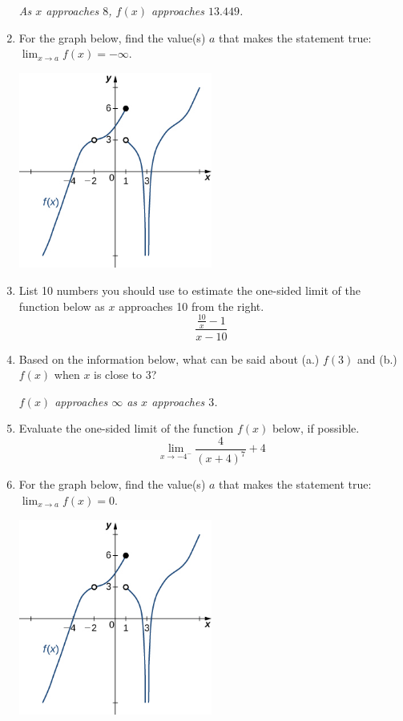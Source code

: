 \documentclass[14pt]{extbook}
\begin{document}
\begin{enumerate}
{\begin{center}
    \textit{ As $x$ approaches $8$, $f(x)$ approaches $13.449$. }
\end{center}
} \newpage
\item{
For the graph below, find the value(s) $a$ that makes the statement true: $ \displaystyle \lim_{x \rightarrow a} f(x) = -\infty$.
\begin{center}
    \includegraphics[width=0.5\textwidth]{../Figures/evaluateLimitGraphicallyC.png}
\end{center}
} \newpage
\item{
List 10 numbers you should use to estimate the one-sided limit of the function below as $x$ approaches 10 from the right.\[ \frac{\frac{10}{x} - 1}{x - 10} \]} \newpage
\item{
Based on the information below, what can be said about (a.) $f(3)$ and (b.) $f(x)$ when $x$ is close to $3$?
\begin{center}
    \textit{ $f(x)$ approaches $\infty$ as $x$ approaches $3$. }
\end{center}
} \newpage
\item{
Evaluate the one-sided limit of the function $f(x)$ below, if possible.\[ \lim_{x \rightarrow -4^-} \frac{4}{(x+4)^7}+4 \]} \newpage
\item{
For the graph below, find the value(s) $a$ that makes the statement true: $ \displaystyle \lim_{x \rightarrow a} f(x) = 0$.
\begin{center}
    \includegraphics[width=0.5\textwidth]{../Figures/evaluateLimitGraphicallyCopyC.png}

\end{center}}
\end{enumerate}
\end{document}
